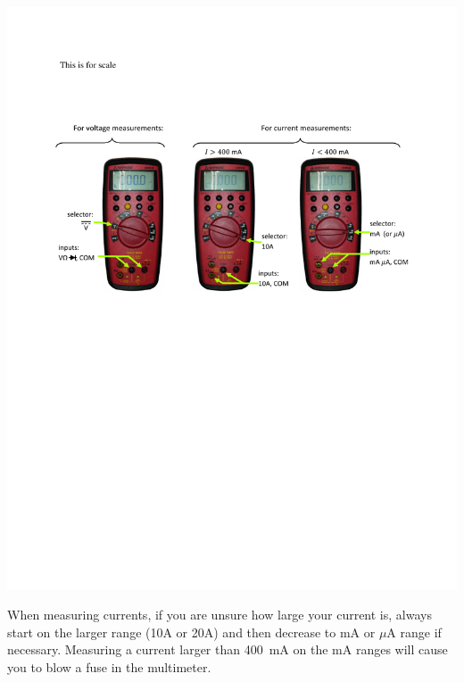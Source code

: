 \includegraphics[width=\textwidth]{appendices/digital_multimeters/dmm_figs_xr37.pdf}

\vspace{\fill}
When measuring currents, if you are unsure how large your current is, always start 
on the larger range (10A or 20A) and then decrease to mA or $\mu$A range if necessary.
Measuring a current larger than 400~mA on the mA ranges will cause you to blow a fuse in the multimeter.